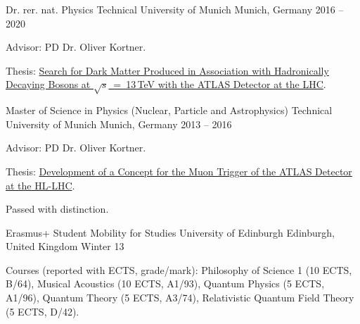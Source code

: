 

\begin{cventries}

  \cventry
    {Dr. rer. nat. Physics} %
    {Technical University of Munich} %
    {Munich, Germany} %
    {2016 -- 2020} %
    {
      \begin{cvitems} %
        \item {Advisor: PD Dr. Oliver Kortner.}
        \item {Thesis: \href{https://cds.cern.ch/record/2744557}{Search for Dark Matter Produced in Association with Hadronically Decaying Bosons at \(\sqrt{s}\)~=~13\,TeV with the ATLAS Detector at the LHC}.}
      \end{cvitems}
    }

  \cventry
    {Master of Science in Physics (Nuclear, Particle and Astrophysics)} %
    {Technical University of Munich} %
    {Munich, Germany} %
    {2013 -- 2016} %
    {
      \begin{cvitems} %
        \item {Advisor: PD Dr. Oliver Kortner.}
        \item {Thesis: \href{https://cds.cern.ch/record/2162398}{Development of a Concept for the Muon Trigger of the ATLAS Detector at the HL-LHC}.}
        \item {Passed with distinction.}
      \end{cvitems}
    }

    \cventry
    {Erasmus+ Student Mobility for Studies} %
    {University of Edinburgh} %
    {Edinburgh, United Kingdom} %
    {Winter 13} %
    {
      \begin{cvitems} %
        \item {Courses (reported with ECTS, grade/mark): Philosophy of Science 1 (10 ECTS, B/64), Musical Acoustics (10 ECTS, A1/93), Quantum Physics (5 ECTS, A1/96), Quantum Theory (5 ECTS, A3/74), Relativistic Quantum Field Theory (5 ECTS, D/42).}
      \end{cvitems}
    }


\end{cventries}
